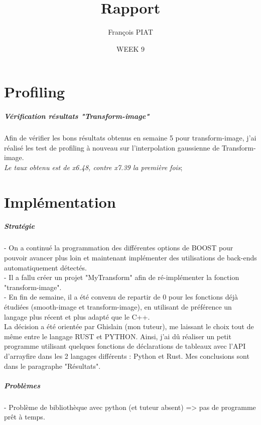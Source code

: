 \documentclass{report}
\title{Rapport}
\author{François PIAT}
\date{WEEK 9}
\begin{document}
\maketitle

\chapter*{Profiling}
\paragraph{Vérification résultats "Transform-image"}
Afin de vérifier les bons résultats obtenus en semaine 5 pour transform-image, j'ai réalisé les test de profiling à nouveau sur l'interpolation gaussienne de Transform-image. \\
\textit{Le taux obtenu est de x6.48, contre x7.39 la première fois};





\chapter*{Implémentation}	

\paragraph{Stratégie}
- On a continué la programmation des différentes options de BOOST pour pouvoir avancer plus loin et maintenant implémenter des utilisations de back-ends automatiquement détectés.\\
- Il a fallu créer un projet "MyTransform" afin de ré-implémenter la fonction "transform-image".\\
- En fin de semaine, il a été convenu de repartir de 0 pour les fonctions déjà étudiées (smooth-image et transform-image), en utilisant de préférence un langage plus récent et plus adapté que le C++. \\
La décision a été orientée par Ghislain (mon tuteur), me laissant le choix tout de même entre le langage RUST et PYTHON. Ainsi, j'ai dû réaliser un petit programme utilisant quelques fonctions de déclarations de tableaux avec l'API d'arrayfire dans les 2 langages différents : Python et Rust. Mes conclusions sont dans le paragraphe "Résultats". 

\paragraph{Problèmes}
- Problème de bibliothèque avec python (et tuteur absent) => pas de programme prêt à temps.
\end{document}
